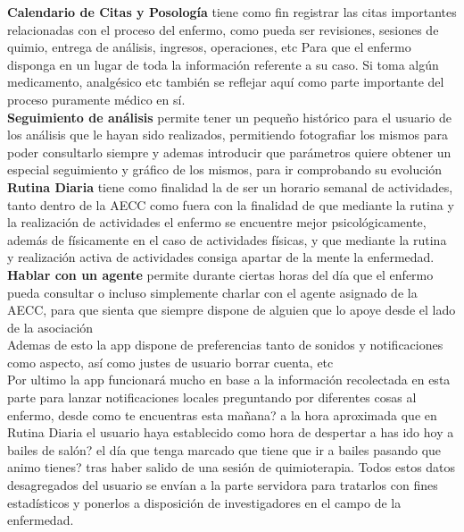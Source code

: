 \documentclass[../pfc.tex]{subfiles}
\begin{document}
	\textbf{Calendario de Citas y Posología} tiene como fin registrar las citas importantes relacionadas con el proceso del enfermo, como pueda ser revisiones, sesiones de quimio, entrega de análisis, ingresos, operaciones, etc Para que el enfermo disponga en un lugar de toda la información referente a su caso. Si toma algún medicamento, analgésico etc también se reflejar aquí como parte importante del proceso puramente médico en sí.\\
	
	\textbf{Seguimiento de análisis} permite tener un pequeño histórico para el usuario de los análisis que le hayan sido realizados, permitiendo fotografiar los mismos para poder consultarlo siempre y ademas introducir que parámetros quiere obtener un especial seguimiento y gráfico de los mismos, para ir comprobando su evolución \\
	
	\textbf{Rutina Diaria} tiene como finalidad la de ser un horario semanal de actividades, tanto dentro de la AECC como fuera con la finalidad de que mediante la rutina y la realización de actividades el enfermo se encuentre mejor psicológicamente, además de físicamente en el caso de actividades físicas, y que mediante la rutina y realización activa de actividades consiga apartar de la mente la enfermedad.\\
	
	\textbf{Hablar con un agente} permite durante ciertas horas del día que el enfermo pueda consultar o incluso simplemente charlar con el agente asignado de la AECC, para que sienta que siempre dispone de alguien que lo apoye desde el lado de la asociación \\
	  
	Ademas de esto la app dispone de preferencias tanto de sonidos y notificaciones como aspecto, así como justes de usuario borrar cuenta, etc\\
	
	Por ultimo la app funcionará mucho en base a la información recolectada en esta parte para lanzar notificaciones locales preguntando por diferentes cosas al enfermo, desde como te encuentras esta mañana? a la hora aproximada que en Rutina Diaria el usuario haya establecido como hora de despertar a has ido hoy a bailes de salón? el día que tenga marcado que tiene que ir a bailes pasando que animo tienes? tras haber salido de una sesión de quimioterapia. Todos estos datos desagregados del usuario se envían a la parte servidora para tratarlos con fines estadísticos y ponerlos a disposición de investigadores en el campo de la enfermedad.
	
\end{document}

